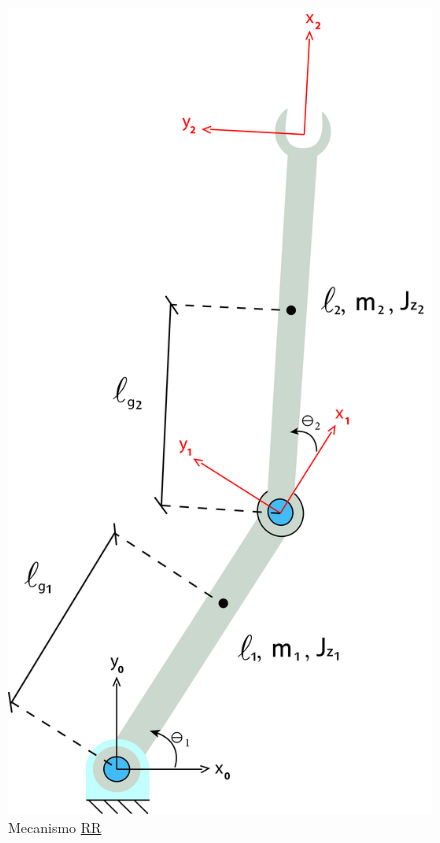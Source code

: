 \documentclass[]{politex}
\begin{document}
\begin{figure}[h]
	\centering
	\includegraphics[scale=0.055]{../figures/RR.jpg}  
	\caption{Mecanismo \underline{R}\underline{R}}
	\label{fig:RR}
\end{figure}
\end{document}
